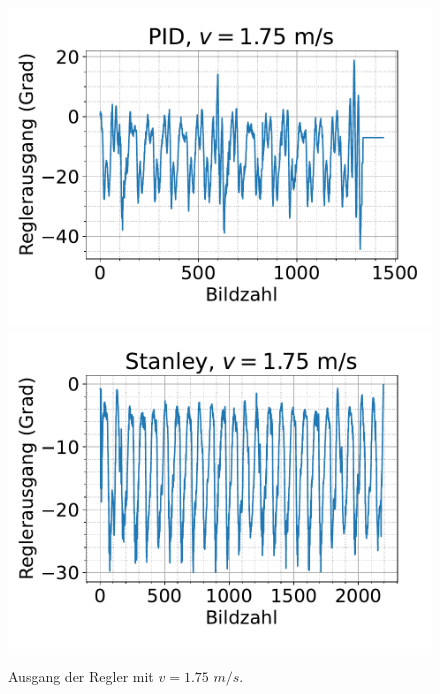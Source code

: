 \documentclass[arbeit=studie,oneside,BCOR=12mm]{ArbeitRST}
\begin{document}
\begin{figure}[h]
    \centering
    \includegraphics[scale=0.47]{pid1.75}
    \includegraphics[scale=0.47]{Stan1.75}
    \caption{Ausgang der Regler mit $v = 1.75$ $m/s$.}
    \label{reg:1.75}
\end{figure}
\end{document}
